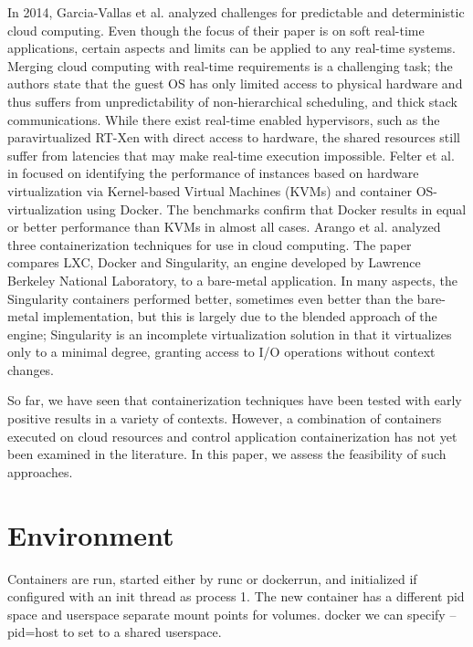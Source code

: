 \documentclass[]{scrartcl}
\begin{document}
In 2014, Garcia-Vallas et al. \cite{Garcia-Vallsetal2014} analyzed challenges for predictable and deterministic cloud computing.
Even though the focus of their paper is on soft real-time applications, certain aspects and limits can be applied to any real-time systems.
Merging cloud computing with real-time requirements is a challenging task; the authors state that the guest OS has only limited access to physical hardware and thus suffers from unpredictability of non-hierarchical scheduling, and thick stack communications. 
While there exist real-time enabled hypervisors, such as the paravirtualized RT-Xen with direct access to hardware, the shared resources still suffer from latencies that may make real-time execution impossible.
Felter et al. in \cite{Felteretal2015} focused on identifying the performance of instances based on hardware virtualization via Kernel-based Virtual Machines (KVMs) and container OS-virtualization using Docker. 
The benchmarks confirm that Docker results in equal or better performance than KVMs in almost all cases.
Arango et al. \cite{Arangoetal2017} analyzed three containerization techniques for use in cloud computing. 
The paper compares LXC, Docker and Singularity, an engine developed by Lawrence Berkeley National Laboratory, to a bare-metal application. 
In many aspects, the Singularity containers performed better, sometimes even better than the bare-metal implementation, but this is largely due to the blended approach of the engine; Singularity is an incomplete virtualization solution in that it virtualizes only to a minimal degree, granting access to I/O operations without context changes.


So far, we have seen that containerization techniques have been tested with early positive results in a variety of contexts.
However, a combination of containers executed on cloud resources and control application containerization has not yet been examined in the literature. 
In this paper, we assess the feasibility of such approaches.


\section{Environment}

Containers are run, started either by runc or dockerrun, and initialized if configured with an init thread as process 1. 
The new container has a different pid space and userspace
separate mount points for volumes. docker we can specify --pid=host to set to a shared userspace.
\end{document}
